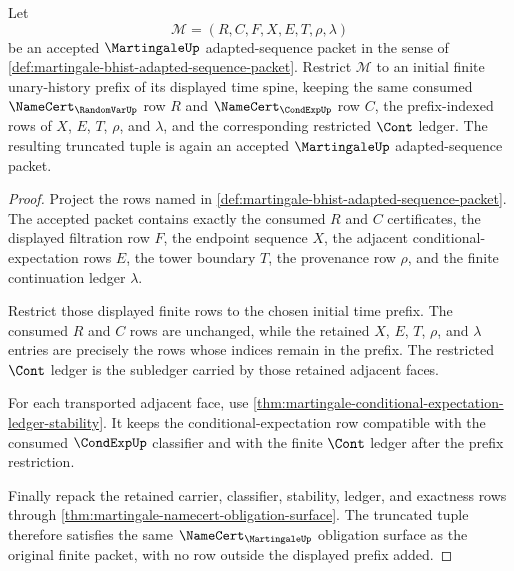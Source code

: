 \begin{theorem}
\label{thm:martingale-finite-prefix-restriction}
Let
$$
\mathcal{M}=(R,C,F,X,E,T,\rho,\lambda)
$$
be an accepted $\MartingaleUp$ adapted-sequence packet in the sense of
\autoref{def:martingale-bhist-adapted-sequence-packet}.  Restrict
$\mathcal M$ to an initial finite unary-history prefix of its displayed time
spine, keeping the same consumed $\NameCert_{\RandomVarUp}$ row $R$ and
$\NameCert_{\CondExpUp}$ row $C$, the prefix-indexed rows of $X$, $E$, $T$,
$\rho$, and $\lambda$, and the corresponding restricted $\Cont$ ledger.  The
resulting truncated tuple is again an accepted $\MartingaleUp$
adapted-sequence packet.
\end{theorem}
\begin{proof}
Project the rows named in
\autoref{def:martingale-bhist-adapted-sequence-packet}.  The accepted packet
contains exactly the consumed $R$ and $C$ certificates, the displayed
filtration row $F$, the endpoint sequence $X$, the adjacent
conditional-expectation rows $E$, the tower boundary $T$, the provenance row
$\rho$, and the finite continuation ledger $\lambda$.

Restrict those displayed finite rows to the chosen initial time prefix.  The
consumed $R$ and $C$ rows are unchanged, while the retained $X$, $E$, $T$,
$\rho$, and $\lambda$ entries are precisely the rows whose indices remain in
the prefix.  The restricted $\Cont$ ledger is the subledger carried by those
retained adjacent faces.

For each transported adjacent face, use
\autoref{thm:martingale-conditional-expectation-ledger-stability}.  It keeps
the conditional-expectation row compatible with the consumed $\CondExpUp$
classifier and with the finite $\Cont$ ledger after the prefix restriction.

Finally repack the retained carrier, classifier, stability, ledger, and
exactness rows through
\autoref{thm:martingale-namecert-obligation-surface}.  The truncated tuple
therefore satisfies the same $\NameCert_{\MartingaleUp}$ obligation surface as
the original finite packet, with no row outside the displayed prefix added.
\end{proof}

